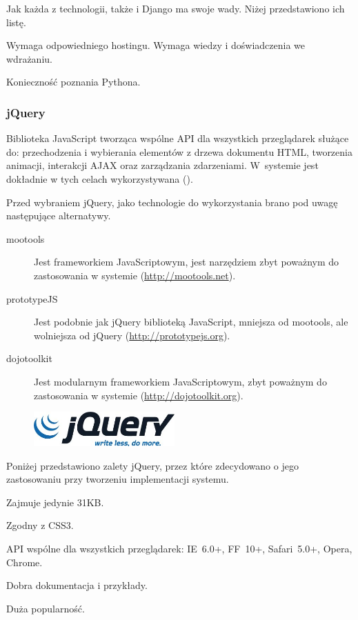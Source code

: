 Jak każda z technologii, także i Django ma swoje wady. Niżej przedstawiono ich listę.
\begin{packed_item}
    \item{Wymaga odpowiedniego hostingu. Wymaga wiedzy i doświadczenia we wdrażaniu.}
    \item{Konieczność poznania Pythona.}
\end{packed_item}

\newpage
\subsubsection{jQuery}
Biblioteka JavaScript tworząca wspólne API dla wszystkich przeglądarek służące do: przechodzenia i wybierania elementów z drzewa dokumentu HTML, tworzenia animacji, interakcji AJAX oraz zarządzania zdarzeniami. W~systemie jest dokładnie w tych celach wykorzystywana (\cite{jQuery}).

Przed wybraniem jQuery, jako technologie do wykorzystania brano pod uwagę następujące alternatywy.
\begin{description}
    \item[mootools] Jest frameworkiem JavaScriptowym, jest narzędziem zbyt poważnym do zastosowania w systemie (\url{http://mootools.net}).
    \item[prototypeJS] Jest podobnie jak jQuery biblioteką JavaScript, mniejsza od mootools, ale wolniejsza od jQuery (\url{http://prototypejs.org}).
    \item[dojotoolkit] Jest modularnym frameworkiem JavaScriptowym, zbyt poważnym do zastosowania w systemie (\url{http://dojotoolkit.org}).
\end{description}

\begin{figure}
  \begin{center}
    \includegraphics[width=0.48\textwidth]{img/logos/jquery.jpg}
  \end{center}
\end{figure}

Poniżej przedstawiono zalety jQuery, przez które zdecydowano o jego zastosowaniu przy tworzeniu implementacji systemu.
\begin{packed_item}
    \item{Zajmuje jedynie 31KB.}
    \item{Zgodny z CSS3.}
    \item{API wspólne dla wszystkich przeglądarek: IE~6.0+, FF~10+, Safari~5.0+, Opera, Chrome.}
    \item{Dobra dokumentacja i przykłady.}
    \item{Duża popularność.}
\end{packed_item}

